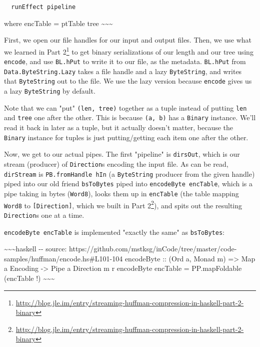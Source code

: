 \documentclass[]{article}
\renewcommand{\href}[2]{#2\footnote{\url{#1}}}
\begin{document}
\begin{verbatim}
  runEffect pipeline
\end{verbatim}

where encTable = ptTable tree
\textasciitilde{}\textasciitilde{}\textasciitilde{}

First, we open our file handles for our input and output files. Then, we use
what we learned in
\href{http://blog.jle.im/entry/streaming-huffman-compression-in-haskell-part-2-binary}{Part
2} to get binary serializations of our length and our tree using
\texttt{encode}, and use \texttt{BL.hPut} to write it to our file, as the
metadata. \texttt{BL.hPut} from \texttt{Data.ByteString.Lazy} takes a file
handle and a lazy \texttt{ByteString}, and writes that \texttt{ByteString} out
to the file. We use the lazy version because \texttt{encode} gives us a lazy
\texttt{ByteString} by default.

Note that we can "put" \texttt{(len,\ tree)} together as a tuple instead of
putting \texttt{len} and \texttt{tree} one after the other. This is because
\texttt{(a,\ b)} has a \texttt{Binary} instance. We'll read it back in later as
a tuple, but it actually doesn't matter, because the \texttt{Binary} instance
for tuples is just putting/getting each item one after the other.

Now, we get to our actual pipes. The first "pipeline" is \texttt{dirsOut}, which
is our stream (producer) of \texttt{Direction}s encoding the input file. As can
be read, \texttt{dirStream} is \texttt{PB.fromHandle\ hIn} (a
\texttt{ByteString} producer from the given handle) piped into our old friend
\texttt{bsToBytes} piped into \texttt{encodeByte\ encTable}, which is a pipe
taking in bytes (\texttt{Word8}), looks them up in \texttt{encTable} (the table
mapping \texttt{Word8} to \texttt{{[}Direction{]}}, which we built in
\href{http://blog.jle.im/entry/streaming-huffman-compression-in-haskell-part-2-binary}{Part
2}), and spits out the resulting \texttt{Direction}s one at a time.

\texttt{encodeByte\ encTable} is implemented "exactly the same" as
\texttt{bsToBytes}:

\textasciitilde{}\textasciitilde{}\textasciitilde{}haskell -\/- source:
https://github.com/mstksg/inCode/tree/master/code-samples/huffman/encode.hs\#L101-104
encodeByte :: (Ord a, Monad m) =\textgreater{} Map a Encoding -\textgreater{}
Pipe a Direction m r encodeByte encTable = PP.mapFoldable (encTable !)
\textasciitilde{}\textasciitilde{}\textasciitilde{}
\end{document}

